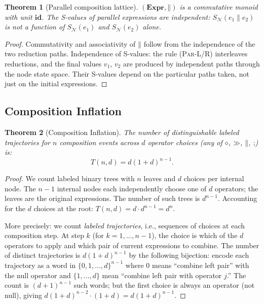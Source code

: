 \documentclass[twocolumn,11pt,a4paper]{article}
\newtheorem{theorem}{Theorem}[section]
\theoremstyle{definition}
\theoremstyle{remark}
\newcommand{\Node}{\mathcal{N}}
\newcommand{\Expr}{\mathbf{Expr}}
\newcommand{\catal}{\mathbin{\gg}}
\newcommand{\comp}{\mathbin{\diamond}}
\newcommand{\par}{\mathbin{\parallel}}
\newcommand{\seq}{\mathbin{;}}
\begin{document}
\begin{theorem}[Parallel composition lattice]
\label{thm:parlattice}
$(\Expr, \par)$ is a commutative monoid with unit $\mathbf{id}$.
The S-values of parallel expressions are independent:
$S_\Node(e_1 \par e_2)$ is not a function of $S_\Node(e_1)$ and
$S_\Node(e_2)$ alone.
\end{theorem}
\begin{proof}
Commutativity and associativity of $\par$ follow from the independence
of the two reduction paths.  Independence of S-values: the rule
\textsc{(Par-L/R)} interleaves reductions, and the final values $v_1$,
$v_2$ are produced by independent paths through the node state space.
Their S-values depend on the particular paths taken, not just on the
initial expressions.
\end{proof}

\subsection{Composition Inflation}

\begin{theorem}[Composition Inflation]
\label{thm:inflation}
The number of distinguishable labeled trajectories for $n$ composition
events across $d$ operator choices (any of $\comp$, $\catal$,
$\par$, $\seq$) is:
\[
T(n, d) = d(1 + d)^{n-1}.
\]
\end{theorem}
\begin{proof}
We count labeled binary trees with $n$ leaves and $d$ choices per
internal node.  The $n-1$ internal nodes each independently choose
one of $d$ operators; the leaves are the original expressions.
The number of such trees is $d^{n-1}$.  Accounting for the $d$
choices at the root: $T(n, d) = d \cdot d^{n-1} = d^n$.

More precisely: we count \emph{labeled trajectories}, i.e., sequences
of choices at each composition step.  At step $k$ (for $k = 1, \ldots,
n-1$), the choice is which of the $d$ operators to apply and which pair
of current expressions to combine.  The number of distinct trajectories
is $d(1+d)^{n-1}$ by the following bijection: encode each trajectory as
a word in $\{0,1,\ldots,d\}^{n-1}$ where $0$ means ``combine left pair''
with the null operator and $\{1,\ldots,d\}$ mean ``combine left pair with
operator $j$.''  The count is $(d+1)^{n-1}$ such words; but the first
choice is always an operator (not null), giving $d(1+d)^{n-2} \cdot
(1+d) = d(1+d)^{n-1}$.
\end{proof}
\end{document}
